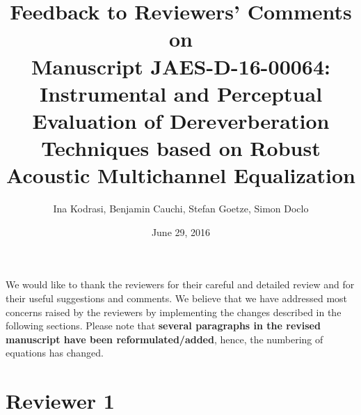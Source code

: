 \documentclass[10pt, a4paper]{article}
\begin{document}
\author{Ina Kodrasi, Benjamin Cauchi, Stefan Goetze, Simon Doclo}
\title{\bf Feedback to Reviewers' Comments on \\ Manuscript JAES-D-16-00064: \\ Instrumental and Perceptual Evaluation of Dereverberation Techniques based on Robust Acoustic Multichannel Equalization}
\date{June 29, 2016} 
\maketitle

We would like to thank the reviewers for their careful and detailed review and for their useful suggestions and comments. 
We believe that we have addressed most concerns raised by the reviewers by implementing the changes described in the following sections.
Please note that {\bf several paragraphs in the revised manuscript have been reformulated/added}, hence, the numbering of equations has changed. 

\section{Reviewer 1}
\end{document}
